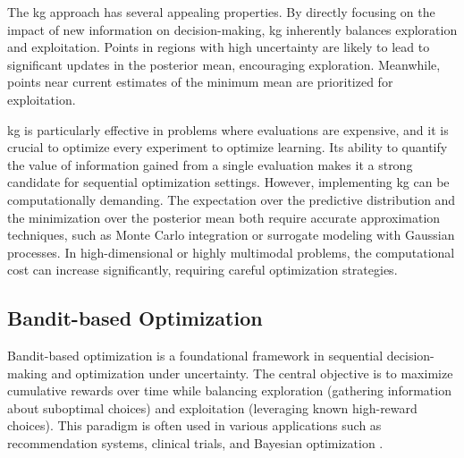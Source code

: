 The \ac{kg} approach has several appealing properties. By directly focusing on the impact of new information on decision-making, \ac{kg} inherently balances exploration and exploitation. Points in regions with high uncertainty are likely to lead to significant updates in the posterior mean, encouraging exploration. Meanwhile, points near current estimates of the minimum mean are prioritized for exploitation.

\ac{kg} is particularly effective in problems where evaluations are expensive, and it is crucial to optimize every experiment to optimize learning. Its ability to quantify the value of information gained from a single evaluation makes it a strong candidate for sequential optimization settings. However, implementing \ac{kg} can be computationally demanding. The expectation over the predictive distribution and the minimization over the posterior mean both require accurate approximation techniques, such as Monte Carlo integration or surrogate modeling with Gaussian processes. In high-dimensional or highly multimodal problems, the computational cost can increase significantly, requiring careful optimization strategies.

\subsection{Bandit-based Optimization}
Bandit-based optimization is a foundational framework in sequential decision-making and optimization under uncertainty. The central objective is to maximize cumulative rewards over time while balancing exploration (gathering information about suboptimal choices) and exploitation (leveraging known high-reward choices). This paradigm is often used in various applications such as recommendation systems, clinical trials, and Bayesian optimization \citep{lattimore2020bandit, bubeck2012regret}.

